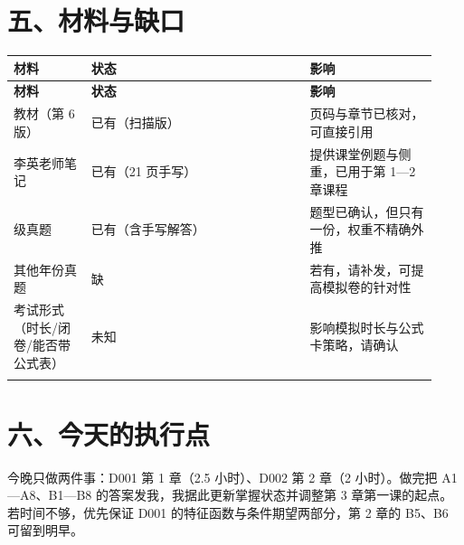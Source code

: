 \documentclass[UTF8,a4paper,11pt]{ctexart}
\begin{document}
\section{五、材料与缺口}
{\small\renewcommand{\arraystretch}{1.38}\setlength{\tabcolsep}{3.5pt}
\begin{longtable}{P{0.17\linewidth}P{0.48\linewidth}P{0.28\linewidth}}
\toprule
\bfseries 材料 & \bfseries 状态 & \bfseries 影响 \\
\midrule
\endfirsthead
\toprule
\bfseries 材料 & \bfseries 状态 & \bfseries 影响 \\
\midrule
\endhead
教材（第 6 版） & 已有（扫描版） & 页码与章节已核对，可直接引用 \\
\addlinespace[.35em]
李英老师笔记 & 已有（21 页手写） & 提供课堂例题与侧重，已用于第 1—2 章课程 \\
 级真题 & 已有（含手写解答） & 题型已确认，但只有一份，权重不精确外推 \\
\addlinespace[.35em]
其他年份真题 & 缺 & 若有，请补发，可提高模拟卷的针对性 \\
\addlinespace[.35em]
考试形式（时长/闭卷/能否带公式表） & 未知 & 影响模拟时长与公式卡策略，请确认 \\
\addlinespace[.35em]
\bottomrule
\end{longtable}
}
\section{六、今天的执行点}
今晚只做两件事：D001 第 1 章（2.5 小时）、D002 第 2 章（2 小时）。做完把 A1—A8、B1—B8 的答案发我，我据此更新掌握状态并调整第 3 章第一课的起点。若时间不够，优先保证 D001 的特征函数与条件期望两部分，第 2 章的 B5、B6 可留到明早。
\end{document}
